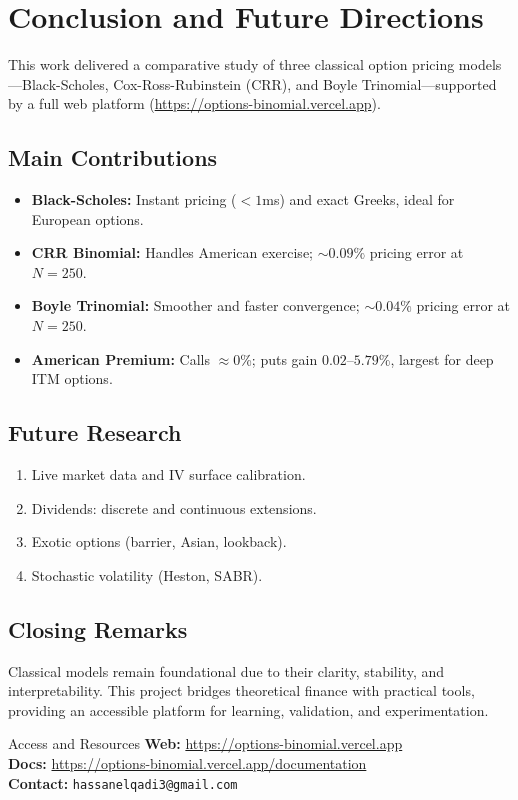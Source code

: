 \documentclass[10pt,twocolumn]{article}
\begin{document}
\section{Conclusion and Future Directions}

This work delivered a comparative study of three classical option pricing models—Black-Scholes, Cox-Ross-Rubinstein (CRR), and Boyle Trinomial—supported by a full web platform (\url{https://options-binomial.vercel.app}).

\subsection{Main Contributions}


\begin{itemize}[itemsep=1pt]
\item \textbf{Black-Scholes:} Instant pricing ($<1$ms) and exact Greeks, ideal for European options.
\item \textbf{CRR Binomial:} Handles American exercise; $\sim 0.09\%$ pricing error at $N=250$.
\item \textbf{Boyle Trinomial:} Smoother and faster convergence; $\sim 0.04\%$ pricing error at $N=250$.
\item \textbf{American Premium:} Calls $\approx 0$\%; puts gain $0.02$–$5.79\%$, largest for deep ITM options.
\end{itemize}



\subsection{Future Research}

\begin{enumerate}[leftmargin=*,itemsep=2pt]
\item Live market data and IV surface calibration.
\item Dividends: discrete and continuous extensions.
\item Exotic options (barrier, Asian, lookback).
\item Stochastic volatility (Heston, SABR).
\end{enumerate}

\subsection{Closing Remarks}

Classical models remain foundational due to their clarity, stability, and interpretability. This project bridges theoretical finance with practical tools, providing an accessible platform for learning, validation, and experimentation.

\begin{keybox}{Access and Resources}
\textbf{Web:} \url{https://options-binomial.vercel.app} \\
\textbf{Docs:} \url{https://options-binomial.vercel.app/documentation} \\
\textbf{Contact:} \texttt{hassanelqadi3@gmail.com}
\end{keybox}
\end{document}
